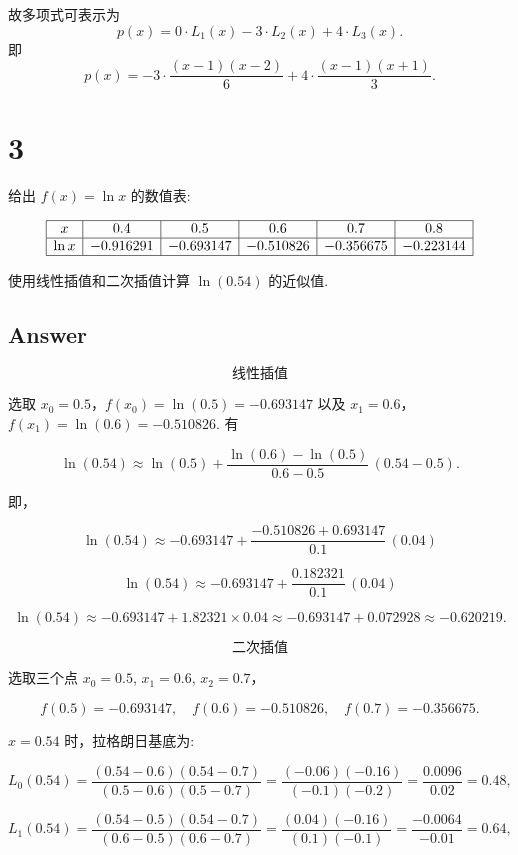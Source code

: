 \documentclass[11pt]{article}
\begin{document}
故多项式可表示为 \[
p(x)=0\cdot L_1(x)-3\cdot L_2(x)+4\cdot L_3(x).
\] 即 \[
\boxed{
p(x)=-3\cdot \frac{(x-1)(x-2)}{6}+4\cdot \frac{(x-1)(x+1)}{3}.
}
\]

    \section{3}\label{section}

给出 \(f(x)=\ln x\) 的数值表:

\[
\begin{array}{|c|c|c|c|c|c|}
\hline
x & 0.4 & 0.5 & 0.6 & 0.7 & 0.8 \\
\hline
\ln x & -0.916291 & -0.693147 & -0.510826 & -0.356675 & -0.223144 \\
\hline
\end{array}
\]

使用线性插值和二次插值计算 \(\ln(0.54)\) 的近似值.

\subsection{Answer}\label{answer}

\[\textbf{线性插值}\]

选取 \(x_0=0.5\)，\(f(x_0)=\ln(0.5)=-0.693147\) 以及
\(x_1=0.6\)，\(f(x_1)=\ln(0.6)=-0.510826\). 有

\[
\ln(0.54) \approx \ln(0.5) + \frac{\ln(0.6)-\ln(0.5)}{0.6-0.5}\,(0.54-0.5).
\]

即，

\[
\ln(0.54) \approx -0.693147 + \frac{-0.510826 + 0.693147}{0.1}\,(0.04)
\]

\[
\ln(0.54) \approx -0.693147 + \frac{0.182321}{0.1}\,(0.04)
\]

\[
\ln(0.54) \approx -0.693147 + 1.82321 \times 0.04 \approx -0.693147 + 0.072928 \approx -0.620219.
\]

\[
\textbf{二次插值}
\]

选取三个点 \(x_0=0.5\), \(x_1=0.6\), \(x_2=0.7\)，

\[
f(0.5)=-0.693147,\quad f(0.6)=-0.510826,\quad f(0.7)=-0.356675.
\]

\(x=0.54\) 时，拉格朗日基底为:

\[
L_0(0.54)=\frac{(0.54-0.6)(0.54-0.7)}{(0.5-0.6)(0.5-0.7)}
=\frac{(-0.06)(-0.16)}{(-0.1)(-0.2)}
=\frac{0.0096}{0.02}=0.48,
\]

\[
L_1(0.54)=\frac{(0.54-0.5)(0.54-0.7)}{(0.6-0.5)(0.6-0.7)}
=\frac{(0.04)(-0.16)}{(0.1)(-0.1)}
=\frac{-0.0064}{-0.01}=0.64,
\]
\end{document}
